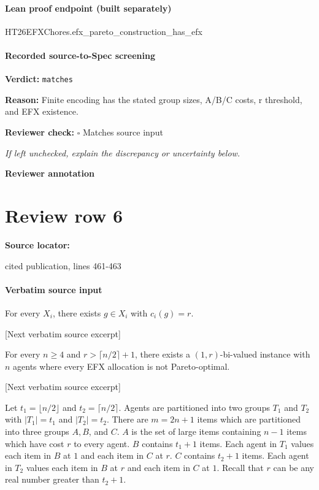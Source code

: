 \documentclass[10pt]{article}
\newcommand{\reviewerbox}{%
  \par\noindent\fbox{\parbox{0.96\linewidth}{\rule{0pt}{0.38in}}}\par
}
\newcommand{\reviewmatch}[1]{%
  \par\noindent\textbf{Reviewer check:} $\square$\; #1\par
  \noindent\emph{If left unchecked, explain the discrepancy or uncertainty below.}\par
}
\begin{document}
\paragraph{Lean proof endpoint (built separately)}\begin{ReviewVerbatim}
HT26EFXChores.efx_pareto_construction_has_efx
\end{ReviewVerbatim}

\paragraph{Recorded source-to-Spec screening}
\textbf{Verdict:} \texttt{matches}
\\
{\raggedright
\textbf{Reason:} Finite encoding has the stated group sizes, A/\allowbreak{}B/\allowbreak{}C costs, r threshold, and EFX existence.\allowbreak{}
\par}
\reviewmatch{Matches source input}
\noindent\textbf{Reviewer annotation}\par
\reviewerbox
\clearpage
\hypertarget{source-claim-5145ed0daed8afc6}{}
\section*{Review row 6}
\textbf{Source locator:} {\footnotesize\raggedright cited publication, lines 461-\allowbreak{}463\par}
\paragraph{Verbatim source input}
\begin{ReviewVerbatim}
\begin{proposition}\label{prop:PO-exist-large}
    For every $X_i$, there exists $g\in X_i$ with $c_i(g)=r$.
\end{proposition}

[Next verbatim source excerpt]

\begin{theorem}\label{thm:EFXPO}
    For every $n\geq 4$ and $r>\lceil n/2\rceil+1$, there exists a $(1,r)$-bi-valued instance with $n$ agents where every EFX allocation is not Pareto-optimal.
\end{theorem}

[Next verbatim source excerpt]

Let $t_1=\lfloor n/2\rfloor$ and $t_2=\lceil n/2\rceil$.
Agents are partitioned into two groups $T_1$ and $T_2$ with $|T_1|=t_1$ and $|T_2|=t_2$.
There are $m=2n+1$ items which are partitioned into three groups $A,B$, and $C$.
$A$ is the set of large items containing $n-1$ items which have cost $r$ to every agent.
$B$ contains $t_1+1$ items.
Each agent in $T_1$ values each item in $B$ at $1$ and each item in $C$ at $r$.
$C$ contains $t_2+1$ items.
Each agent in $T_2$ values each item in $B$ at $r$ and each item in $C$ at $1$.
Recall that $r$ can be any real number greater than $t_2+1$.
\end{ReviewVerbatim}
\end{document}
